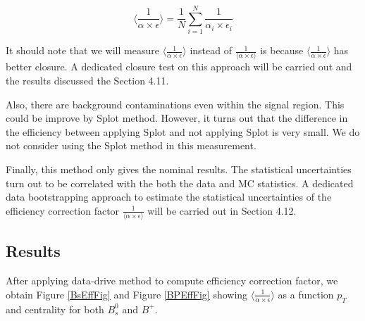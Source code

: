 \begin{equation}
\langle\frac{1}{\alpha \times \epsilon} \rangle = \frac{1}{N} \sum_{i = 1}^{N} \frac{1}{\alpha_i \times \epsilon_i}
\end{equation}

It should note that we will measure  $\langle\frac{1}{\alpha \times \epsilon} \rangle$ instead of $\frac{1}{\langle\alpha \times \epsilon \rangle}$ is because $\langle\frac{1}{\alpha \times \epsilon} \rangle$ has better closure. A dedicated closure test on this approach will be carried out and the results discussed the Section 4.11. 

Also, there are background contaminations even within the signal region. This could be improve by Splot method. However, it turns out that the difference in the efficiency between applying Splot and not applying Splot is very small. We do not consider using the Splot method in this measurement. 

Finally, this method only gives the nominal results. The statistical uncertainties turn out to be correlated with the both the data and MC statistics. A dedicated data bootstrapping approach to estimate the statistical uncertainties of the efficiency correction factor $\frac{1}{\langle\alpha \times \epsilon \rangle}$ will be carried out in Section 4.12.

\subsection{Results}

After applying data-drive method to compute efficiency correction factor, we obtain Figure \ref{BsEffFig} and Figure \ref{BPEffFig} showing $\langle\frac{1}{\alpha \times \epsilon} \rangle$ as a function $p_T$ and centrality for both $B_s^0$ and $B^+$.


